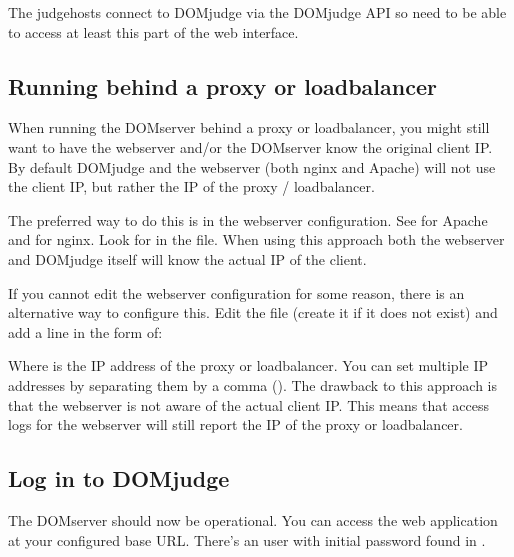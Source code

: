 \documentclass[a4paper,10pt,english,openany]{sphinxmanual}
\begin{document}
\sphinxAtStartPar
The judgehosts connect to DOMjudge via the DOMjudge API so need
to be able to access at least this part of the web interface.


\subsection{Running behind a proxy or loadbalancer}
\label{\detokenize{install-domserver:running-behind-a-proxy-or-loadbalancer}}
\sphinxAtStartPar
When running the DOMserver behind a proxy or loadbalancer, you might still want
to have the webserver and/or the DOMserver know the original client IP. By
default DOMjudge and the webserver (both nginx and Apache) will not use the
client IP, but rather the IP of the proxy / loadbalancer.

\sphinxAtStartPar
The preferred way to do this is in the webserver configuration. See
 for Apache and
 for nginx. Look for 
in the file. When using this approach both the webserver and DOMjudge itself
will know the actual IP of the client.

\sphinxAtStartPar
If you cannot edit the webserver configuration for some reason, there is an
alternative way to configure this. Edit the file  (create
it if it does not exist) and add a line in the form of:

\begin{sphinxVerbatim}[commandchars=\\\{\}]
\end{sphinxVerbatim}

\sphinxAtStartPar
Where  is the IP address of the proxy or loadbalancer. You can set
multiple IP addresses by separating them by a comma (\sphinxcode{\sphinxupquote{,}}). The drawback to
this approach is that the webserver is not aware of the actual client IP. This
means that access logs for the webserver will still report the IP of the proxy
or loadbalancer.


\subsection{Log in to DOMjudge}
\label{\detokenize{install-domserver:log-in-to-domjudge}}
\sphinxAtStartPar
The DOMserver should now be operational. You can access the web application
at your configured base URL. There’s an  user with initial password
found in .
\end{document}
